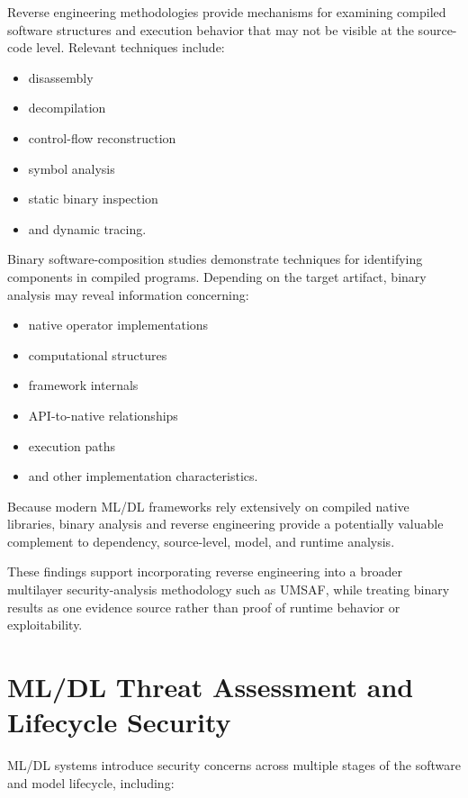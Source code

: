 \documentclass[
  12pt,
  letterpaper,
  oneside]{report}
\providecommand{\tightlist}{%
  \setlength{\itemsep}{0pt}\setlength{\parskip}{0pt}}
\begin{document}
Reverse engineering methodologies provide mechanisms for examining
compiled software structures and execution behavior that may not be
visible at the source-code level. Relevant techniques include:

\begin{itemize}
\tightlist
\item
  disassembly
\item
  decompilation
\item
  control-flow reconstruction
\item
  symbol analysis
\item
  static binary inspection
\item
  and dynamic tracing.
\end{itemize}

Binary software-composition studies demonstrate techniques for
identifying components in compiled programs. Depending on the target
artifact, binary analysis may reveal information concerning:

\begin{itemize}
\tightlist
\item
  native operator implementations
\item
  computational structures
\item
  framework internals
\item
  API-to-native relationships
\item
  execution paths
\item
  and other implementation characteristics.
\end{itemize}

Because modern ML/DL frameworks rely extensively on compiled native
libraries, binary analysis and reverse engineering provide a potentially
valuable complement to dependency, source-level, model, and runtime
analysis.

These findings support incorporating reverse engineering into a broader
multilayer security-analysis methodology such as UMSAF, while treating
binary results as one evidence source rather than proof of runtime
behavior or exploitability.\cite{ning2024binarysca,wang2024binarysca}

\section{ML/DL Threat Assessment and Lifecycle Security}\label{815-mldl-threat-assessment-and-lifecycle-security}

ML/DL systems introduce security concerns across multiple stages of the
software and model lifecycle, including:
\end{document}

